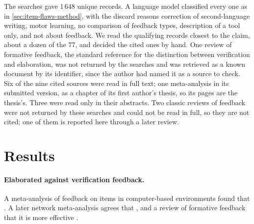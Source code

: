 The searches gave 1\,648 unique records.  A language model classified
every one as in \cref{sec:item-flaws-method}, with the discard reasons
correction of second-language writing, motor learning, no comparison of
feedback types, description of a tool only, and not about feedback.  We
read the qualifying records closest to the claim, about a dozen of the 77,
and decided the cited ones by hand.  One review of formative feedback, the
standard reference for the distinction between verification and
elaboration, was not returned by the searches and was retrieved as a known
document by its identifier, since the author had named it as a source to
check. Six of the nine cited sources were read in full text; one
meta-analysis in its submitted version, as a chapter of its first author's
thesis, so its pages are the thesis's. Three were read only in their
abstracts.  Two classic reviews of feedback were not returned by these
searches and could not be read in full, so they are not cited; one of them
is reported here through a later review.

\section{Results}
\label{sec:feedback-results}

\paragraph{Elaborated against verification feedback.}
A meta-analysis of feedback on items in computer-based environments found
that .  A later network meta-analysis agrees that
,
and a review of formative feedback that it is more effective
.

